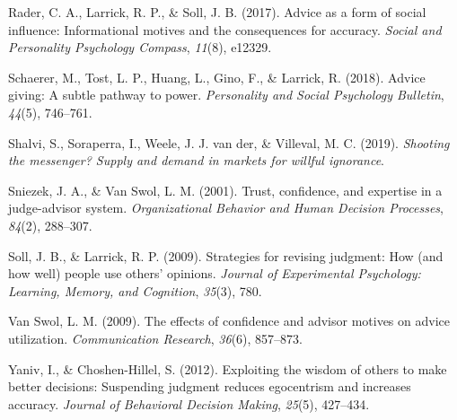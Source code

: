 \documentclass[
  man,
  floatsintext,
  longtable,
  nolmodern,
  notxfonts,
  notimes,
  colorlinks=true,linkcolor=blue,citecolor=blue,urlcolor=blue]{apa7}
\newlength{\cslhangindent}
\newenvironment{CSLReferences}[2] %
 {\begin{list}{}{%
  \setlength{\itemindent}{0pt}
  \setlength{\leftmargin}{0pt}
  \setlength{\parsep}{0pt}
  \ifodd #1
   \setlength{\leftmargin}{\cslhangindent}
   \setlength{\itemindent}{-1\cslhangindent}
  \fi
  \setlength{\itemsep}{#2\baselineskip}}}
 {\end{list}}
\begin{document}
\begin{CSLReferences}{1}{0}
Rader, C. A., Larrick, R. P., \& Soll, J. B. (2017). Advice as a form of
social influence: Informational motives and the consequences for
accuracy. \emph{Social and Personality Psychology Compass},
\emph{11}(8), e12329.

Schaerer, M., Tost, L. P., Huang, L., Gino, F., \& Larrick, R. (2018).
Advice giving: A subtle pathway to power. \emph{Personality and Social
Psychology Bulletin}, \emph{44}(5), 746--761.

Shalvi, S., Soraperra, I., Weele, J. J. van der, \& Villeval, M. C.
(2019). \emph{Shooting the messenger? Supply and demand in markets for
willful ignorance}.

Sniezek, J. A., \& Van Swol, L. M. (2001). Trust, confidence, and
expertise in a judge-advisor system. \emph{Organizational Behavior and
Human Decision Processes}, \emph{84}(2), 288--307.

Soll, J. B., \& Larrick, R. P. (2009). Strategies for revising judgment:
How (and how well) people use others' opinions. \emph{Journal of
Experimental Psychology: Learning, Memory, and Cognition}, \emph{35}(3),
780.

Van Swol, L. M. (2009). The effects of confidence and advisor motives on
advice utilization. \emph{Communication Research}, \emph{36}(6),
857--873.

Yaniv, I., \& Choshen-Hillel, S. (2012). Exploiting the wisdom of others
to make better decisions: Suspending judgment reduces egocentrism and
increases accuracy. \emph{Journal of Behavioral Decision Making},
\emph{25}(5), 427--434.

\end{CSLReferences}
\end{document}
